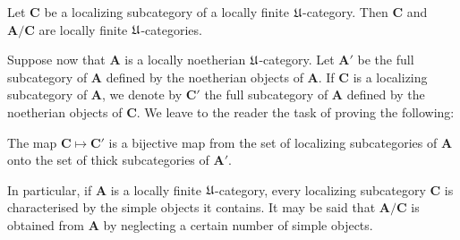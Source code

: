 \begin{corollary}
Let $\mathbf{C}$ be a localizing subcategory of a locally finite
$\mathfrak{U}$-category. Then $\mathbf{C}$ and $\mathbf{A}/\mathbf{C}$ are
locally finite $\mathfrak{U}$-categories.
\end{corollary}

Suppose now that $\mathbf{A}$ is a locally noetherian
$\mathfrak{U}$-category. Let $\mathbf{A}'$ be the full subcategory of
$\mathbf{A}$ defined by the noetherian objects of $\mathbf{A}$. If
$\mathbf{C}$ is a localizing subcategory of $\mathbf{A}$, we denote
by $\mathbf{C}'$ the full subcategory of $\mathbf{A}$ defined by the
noetherian objects of $\mathbf{C}$. We leave to the reader the task
of proving the following:

\begin{proposition}
The map $\mathbf{C}\mapsto\mathbf{C}'$ is a bijective map from the
set of localizing subcategories of $\mathbf{A}$ onto the set of thick
subcategories of $\mathbf{A}'$.
\end{proposition}

In particular, if $\mathbf{A}$ is a locally finite $\mathfrak{U}$-category,
every localizing subcategory $\mathbf{C}$ is characterised by the
simple objects it contains. It may be said that
$\mathbf{A}/\mathbf{C}$ is obtained from $\mathbf{A}$ by neglecting a
certain number of simple objects.
